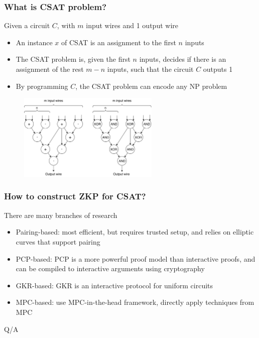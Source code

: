\documentclass{beamer}
\begin{document}
{
  \frametitle{What is CSAT problem?}

  \onslide<+-> Given a circuit $C$, with $m$ input wires and 1 output wire
  \begin{itemize}
    \item<+-> An instance $x$ of CSAT is an assignment to the first $n$ inputs
    \item<+-> The CSAT problem is, given the first $n$ inputs, decides if there is an assignment of the rest $m-n$ inputs, such that the circuit $C$ outputs 1
    \item<+-> By programming $C$, the CSAT problem can encode any NP problem
  \end{itemize}

  \begin{figure}[ht!]
  \includegraphics[width=0.6\textwidth]{images/ZKP-Circuits.pdf}
  \end{figure}
}

{
  \frametitle{How to construct ZKP for CSAT?}

  \onslide<+-> There are many branches of research
  \begin{itemize}
    \item<+-> Pairing-based: most efficient, but requires trusted setup, and relies on elliptic curves that support pairing
    \item<+-> PCP-based: PCP is a more powerful proof model than interactive proofs, and can be compiled to interactive arguments using cryptography
    \item<+-> GKR-based: GKR is an interactive protocol for uniform circuits
    \item<+-> MPC-based: use MPC-in-the-head framework, directly apply techniques from MPC
  \end{itemize}
}

\frame
{
  \center\huge Q/A
}
\end{document}
